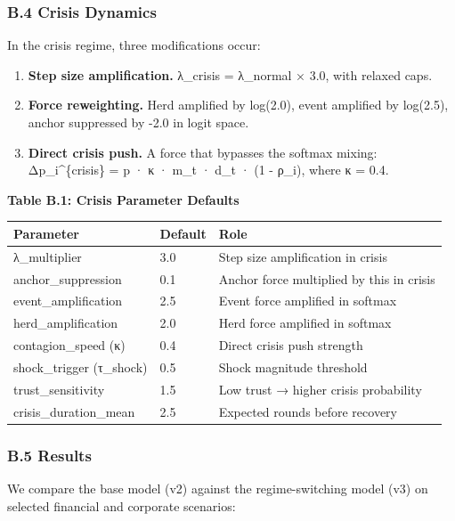 \documentclass[
]{article}
\providecommand{\tightlist}{%
  \setlength{\itemsep}{0pt}\setlength{\parskip}{0pt}}
\begin{document}
\subsubsection{B.4 Crisis Dynamics}\label{b.4-crisis-dynamics}

In the crisis regime, three modifications occur:

\begin{enumerate}
\def\labelenumi{\arabic{enumi}.}
\tightlist
\item
  \textbf{Step size amplification.} λ\_crisis = λ\_normal × 3.0, with
  relaxed caps.
\item
  \textbf{Force reweighting.} Herd amplified by log(2.0), event
  amplified by log(2.5), anchor suppressed by -2.0 in logit space.
\item
  \textbf{Direct crisis push.} A force that bypasses the softmax mixing:
  Δp\_i\^{}\{crisis\} = p · κ · m\_t · d\_t · (1 - ρ\_i), where κ = 0.4.
\end{enumerate}

\textbf{Table B.1: Crisis Parameter Defaults}

\begin{longtable}[]{@{}lll@{}}
\toprule\noalign{}
Parameter & Default & Role \\
\midrule\noalign{}
\endhead
\bottomrule\noalign{}
\endlastfoot
λ\_multiplier & 3.0 & Step size amplification in crisis \\
anchor\_suppression & 0.1 & Anchor force multiplied by this in crisis \\
event\_amplification & 2.5 & Event force amplified in softmax \\
herd\_amplification & 2.0 & Herd force amplified in softmax \\
contagion\_speed (κ) & 0.4 & Direct crisis push strength \\
shock\_trigger (τ\_shock) & 0.5 & Shock magnitude threshold \\
trust\_sensitivity & 1.5 & Low trust → higher crisis probability \\
crisis\_duration\_mean & 2.5 & Expected rounds before recovery \\
\end{longtable}

\subsubsection{B.5 Results}\label{b.5-results}

We compare the base model (v2) against the regime-switching model (v3)
on selected financial and corporate scenarios:
\end{document}
